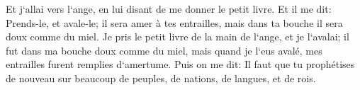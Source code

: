\verse Et j`allai vers l`ange, en lui disant de me donner le petit livre. Et il me dit: Prends-le, et avale-le; il sera amer à tes entrailles, mais dans ta bouche il sera doux comme du miel. 
\verse Je pris le petit livre de la main de l`ange, et je l`avalai; il fut dans ma bouche doux comme du miel, mais quand je l`eus avalé, mes entrailles furent remplies d`amertume. 
\verse Puis on me dit: Il faut que tu prophétises de nouveau sur beaucoup de peuples, de nations, de langues, et de rois. 

\chapter{}

